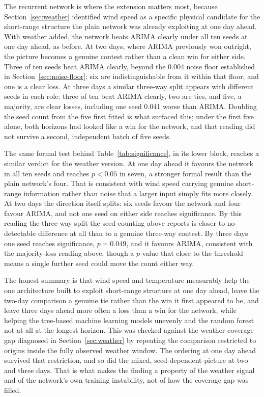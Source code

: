 \documentclass[12pt,a4paper]{report}
\begin{document}
The recurrent network is where the extension matters most, because Section~\ref{sec:weather} identified wind speed as a specific physical candidate for the short-range structure the plain network was already exploiting at one day ahead. With weather added, the network beats ARIMA clearly under all ten seeds at one day ahead, as before. At two days, where ARIMA previously won outright, the picture becomes a genuine contest rather than a clean win for either side. Three of ten seeds beat ARIMA clearly, beyond the 0.004 noise floor established in Section~\ref{sec:noise-floor}; six are indistinguishable from it within that floor, and one is a clear loss. At three days a similar three-way split appears with different seeds in each role: three of ten beat ARIMA clearly, two are ties, and five, a majority, are clear losses, including one seed 0.041 worse than ARIMA. Doubling the seed count from the five first fitted is what surfaced this; under the first five alone, both horizons had looked like a win for the network, and that reading did not survive a second, independent batch of five seeds.

The same formal test behind Table~\ref{tab:significance}, in its lower block, reaches a similar verdict for the weather version. At one day ahead it favours the network in all ten seeds and reaches $p<0.05$ in seven, a stronger formal result than the plain network's four. That is consistent with wind speed carrying genuine short-range information rather than noise that a larger input simply fits more closely. At two days the direction itself splits: six seeds favour the network and four favour ARIMA, and not one seed on either side reaches significance. By this reading the three-way split the seed-counting above reports is closer to no detectable difference at all than to a genuine three-way contest. By three days one seed reaches significance, $p=0.049$, and it favours ARIMA, consistent with the majority-loss reading above, though a $p$-value that close to the threshold means a single further seed could move the count either way.

The honest summary is that wind speed and temperature measurably help the one architecture built to exploit short-range structure at one day ahead, leave the two-day comparison a genuine tie rather than the win it first appeared to be, and leave three days ahead more often a loss than a win for the network, while helping the tree-based machine learning models unevenly and the random forest not at all at the longest horizon. This was checked against the weather coverage gap diagnosed in Section~\ref{sec:weather} by repeating the comparison restricted to origins inside the fully observed weather window. The ordering at one day ahead survived that restriction, and so did the mixed, seed-dependent picture at two and three days. That is what makes the finding a property of the weather signal and of the network's own training instability, not of how the coverage gap was filled.
\end{document}
